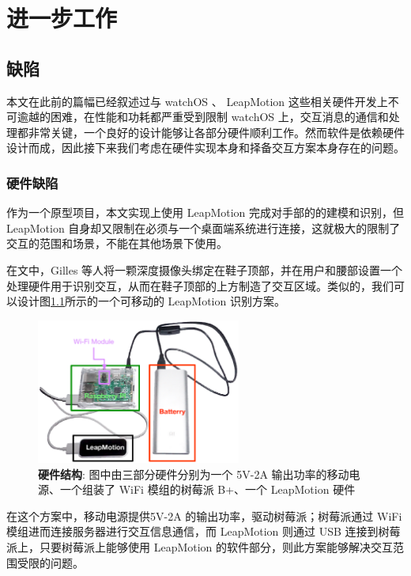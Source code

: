 \chapter{进一步工作}

\section{缺陷}

本文在此前的篇幅已经叙述过与 watchOS 、 LeapMotion 这些相关硬件开发上不可逾越的困难，在性能和功耗都严重受到限制 watchOS 上，交互消息的通信和处理都非常关键，一个良好的设计能够让各部分硬件顺利工作。然而软件是依赖硬件设计而成，因此接下来我们考虑在硬件实现本身和择备交互方案本身存在的问题。

\subsection{硬件缺陷}

作为一个原型项目，本文实现上使用 LeapMotion 完成对手部的的建模和识别，但 LeapMotion 自身却又限制在必须与一个桌面端系统进行连接，这就极大的限制了交互的范围和场景，不能在其他场景下使用。

在文\cite{Bailly:2012:SNP:2207676.2208576}中，Gilles 等人将一颗深度摄像头绑定在鞋子顶部，并在用户和腰部设置一个处理硬件用于识别交互，从而在鞋子顶部的上方制造了交互区域。类似的，我们可以设计图\ref{fig:hardware}所示的一个可移动的 LeapMotion 识别方案。

\begin{figure}[H]
    \centering
    \includegraphics[width=0.6\textwidth]{figures/hardware}
    \caption{\kaishu \textbf{硬件结构}: 图中由三部分硬件分别为一个 5V-2A 输出功率的移动电源、一个组装了 WiFi 模组的树莓派 B+、一个 LeapMotion 硬件}
    \label{fig:hardware}
\end{figure}

在这个方案中，移动电源提供5V-2A 的输出功率，驱动树莓派；树莓派通过 WiFi 模组进而连接服务器进行交互信息通信，而 LeapMotion 则通过 USB 连接到树莓派上，只要树莓派上能够使用 LeapMotion 的软件部分，则此方案能够解决交互范围受限的问题。


